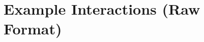 \documentclass[11pt,a4paper]{article}
\begin{document}
\begin{comment}
\subsection*{Example 3}
User: No.\\
Robot: No worries! Have a great day at the beach!

\subsection*{Example 4}
User: F*** yer.\\
Robot: I apologize if I've upset you.\\
User: I just want to chat. What do you have?\\
Robot: Here are our beers: Kingfisher, Carlsberg, Thy Porter...\\
User: I want a Monster.\\
Robot: Sorry, we only serve the beers on the menu.\\
User: Please, one Monster.\\
Robot: I really can’t help with that, but I’d love to recommend one of our listed beers.\\
User: All right, f*** you!\\
Robot: I'm sorry if there was a misunderstanding. I'm here if you change your mind.

\subsection*{Example 5}
User: Fish.\\
Robot: You might be interested in our beers. Here are the options...\\
User: Now I'm a Muslim. Burn the sinner.\\
Robot: You might need a moment. Let me know if you'd like to hear more about the beers.
\end{comment}

\section{Example Interactions (Raw Format)}
\end{document}
